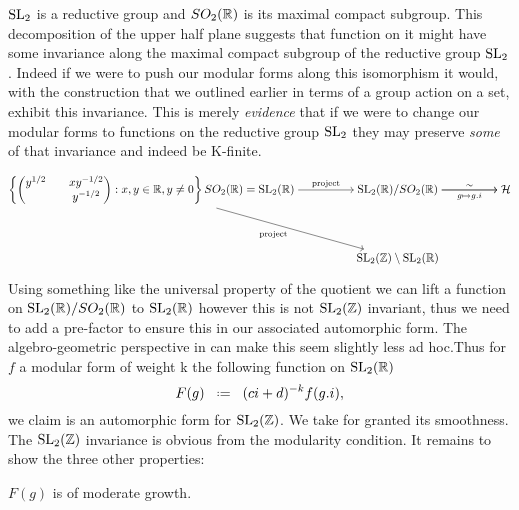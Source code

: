 	
	
	\(\operatorname{SL}_2\) is a reductive group and \(SO_2(\R)\) is its maximal compact subgroup. This decomposition of the upper half plane suggests that function on it might have some invariance along the maximal compact subgroup of the reductive group \(\operatorname{SL}_2\). Indeed if we were to push our modular forms along this isomorphism it would, with the construction that we outlined earlier in terms of a group action on a set, exhibit this invariance. This is merely \textit{evidence} that if we were to change our modular forms to functions on the reductive group \(\operatorname{SL}_2\) they may preserve \textit{some} of that invariance and indeed be K-finite.
    
	\[\begin{tikzcd}[cramped]
		{\left\{\begin{pmatrix}y^{1/2} & x y^{-1/2}\\ & y^{-1/2}\end{pmatrix} : x,y\in \R, y\neq 0 \right\} SO_2(\R)=\SL_2(\R)} && {\SL_2(\R)/SO_2(\R)} && {\mathcal{H}} \\
		\\
		&& {\SL_2(\Z)\setminus\SL_2(\R)}
		\arrow["\sim", from=1-3, to=1-5]
		\arrow["\mathrm{project}", from=1-1, to=1-3]
		\arrow["{g\mapsto g.i}"', from=1-3, to=1-5]
		\arrow["{\text{project}}"', from=1-1, to=3-3]
	\end{tikzcd}\]

    Using something like the universal property of the quotient we can lift a function on \(\SL_2(\R) / SO_2(\R)\) to \(\SL_2(\R)\) however this is not \(\SL_2(\Z)\) invariant, thus we need to add a pre-factor to ensure this in our associated automorphic form. The algebro-geometric perspective in \cite{emertonCLASSICALMODULARFORMS} can make this seem slightly less ad hoc.Thus for \(f\) a modular form of weight k the following function on \(\SL_2(\R)\)
	\[F(g) \defeq  (ci + d)^{-k}f(g.i),\]
	we claim is an automorphic form for \(\SL_2(\Z)\). We take for granted its smoothness. The \(\SL_2(\Z)\) invariance is obvious from the modularity condition. It remains to show the three other properties:

	\begin{Lemma}
		\(F(g)\) is of moderate growth.
	\end{Lemma}

